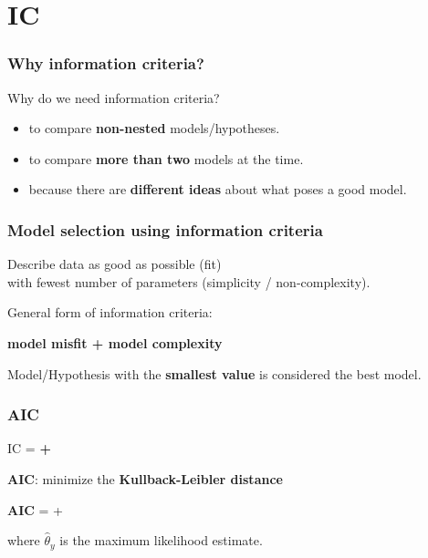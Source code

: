 \documentclass[10pt]{beamer}\usepackage[]{graphicx}\usepackage[]{xcolor}
\begin{document}
\section{IC}
%
%
\begin{frame}
	\frametitle{Why information criteria?}
	Why do we need information criteria?
	\begin{itemize}
		\item to compare \textbf{non-nested} models/hypotheses.
		\item to compare \textbf{more than two} models at the time.
		\item because there are \textbf{different ideas} about what poses a good model.
	\end{itemize}
	
\end{frame}
%
\begin{frame}
	\frametitle{Model selection using information criteria}
	
	Describe data as good as possible (fit) \\
  with fewest number of parameters (simplicity / non-complexity).
	
	\bigskip
	
	\begin{block}{General form of information criteria:}
		\bigskip
		{\centerline{
				\textbf{model misfit + model complexity}}
		}
	\end{block}

	\bigskip
	Model/Hypothesis with the \textbf{smallest value} is considered the best model.
\end{frame}
%
\begin{frame}
	\frametitle{AIC}
	
	\centerline{	IC = \textbf{{\color{orange}{model misfit}} + {\color{purple}{model complexity}}}}
	\vspace{.5 cm}
	
	{\textbf{AIC}: minimize the \textbf{Kullback-Leibler distance}}

	\vspace{1cm}
	\centerline{{\textbf{AIC} ={} + \color{purple}{$2 p$}}}
	
	\vspace{.5 cm}
	where $\hat{\theta}_y$ is the maximum likelihood estimate.
	
\end{frame}
\end{document}
